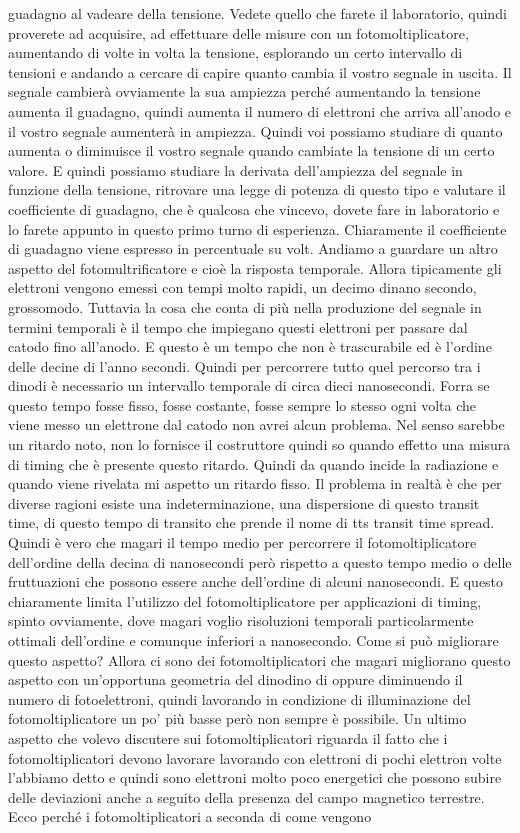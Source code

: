 guadagno al vadeare della tensione. Vedete quello che farete il laboratorio, quindi proverete ad acquisire, ad effettuare delle misure con un fotomoltiplicatore, aumentando di volte in volta la tensione, esplorando un certo intervallo di tensioni e andando a cercare di capire quanto cambia il vostro segnale in uscita. Il segnale cambierà ovviamente la sua ampiezza perché aumentando la tensione aumenta il guadagno, quindi aumenta il numero di elettroni che arriva all'anodo e il vostro segnale aumenterà in ampiezza. Quindi voi possiamo studiare di quanto aumenta o diminuisce il vostro segnale quando cambiate la tensione di un certo valore. E quindi possiamo studiare la derivata dell'ampiezza del segnale in funzione della tensione, ritrovare una legge di potenza di questo tipo e valutare il coefficiente di guadagno, che è qualcosa che vincevo, dovete fare in laboratorio e lo farete appunto in questo primo turno di esperienza. Chiaramente il coefficiente di guadagno viene espresso in percentuale su volt. Andiamo a guardare un altro aspetto del fotomultrificatore e cioè la risposta temporale. Allora tipicamente gli elettroni vengono emessi con tempi molto rapidi, un decimo dinano secondo, grossomodo. Tuttavia la cosa che conta di più nella produzione del segnale in termini temporali è il tempo che impiegano questi elettroni per passare dal catodo fino all'anodo. E questo è un tempo che non è trascurabile ed è l'ordine delle decine di l'anno secondi. Quindi per percorrere tutto quel percorso tra i dinodi è necessario un intervallo temporale di circa dieci nanosecondi. Forra se questo tempo fosse fisso, fosse costante, fosse sempre lo stesso ogni volta che viene messo un elettrone dal catodo non avrei alcun problema. Nel senso sarebbe un ritardo noto, non lo fornisce il costruttore quindi so quando effetto una misura di timing che è presente questo ritardo. Quindi da quando incide la radiazione e quando viene rivelata mi aspetto un ritardo fisso. Il problema in realtà è che per diverse ragioni esiste una indeterminazione, una dispersione di questo transit time, di questo tempo di transito che prende il nome di tts transit time spread. Quindi è vero che magari il tempo medio per percorrere il fotomoltiplicatore dell'ordine della decina di nanosecondi però rispetto a questo tempo medio o delle fruttuazioni che possono essere anche dell'ordine di alcuni nanosecondi. E questo chiaramente limita l'utilizzo del fotomoltiplicatore per applicazioni di timing, spinto ovviamente, dove magari voglio risoluzioni temporali particolarmente ottimali dell'ordine e comunque inferiori a nanosecondo. Come si può migliorare questo aspetto? Allora ci sono dei fotomoltiplicatori che magari migliorano questo aspetto con un'opportuna geometria del dinodino di oppure diminuendo il numero di fotoelettroni, quindi lavorando in condizione di illuminazione del fotomoltiplicatore un po' più basse però non sempre è possibile. Un ultimo aspetto che volevo discutere sui fotomoltiplicatori riguarda il fatto che i fotomoltiplicatori devono lavorare lavorando con elettroni di pochi elettron volte l'abbiamo detto e quindi sono elettroni molto poco energetici che possono subire delle deviazioni anche a seguito della presenza del campo magnetico terrestre. Ecco perché i fotomoltiplicatori a seconda di come vengono 